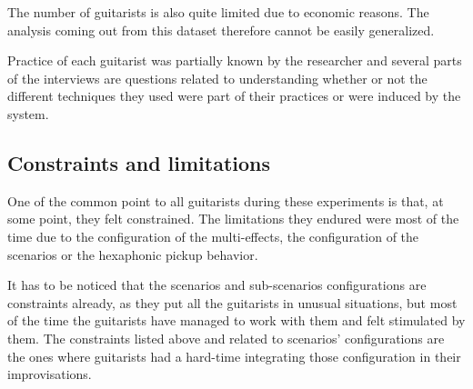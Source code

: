 \documentclass{article}
\begin{document}

The number of guitarists is also quite limited due to economic reasons. The analysis coming out from this dataset therefore cannot be easily generalized.  

Practice of each guitarist was partially known by the researcher and several parts of the interviews are questions related to understanding whether or not the different techniques they used were part of their practices or were induced by the system.


%
    


\subsection{Constraints and limitations}
One of the common point to all guitarists during these experiments is that, at some point, they felt constrained. The limitations they endured were most of the time due to the configuration of the multi-effects, the configuration of the scenarios or the hexaphonic pickup behavior.

It has to be noticed that the scenarios and sub-scenarios configurations are constraints already, as they put all the guitarists in unusual situations, but most of the time the guitarists have managed to work with them and felt stimulated by them. The constraints listed above and related to scenarios' configurations are the ones where guitarists had a hard-time integrating those configuration in their improvisations.
\end{document}
